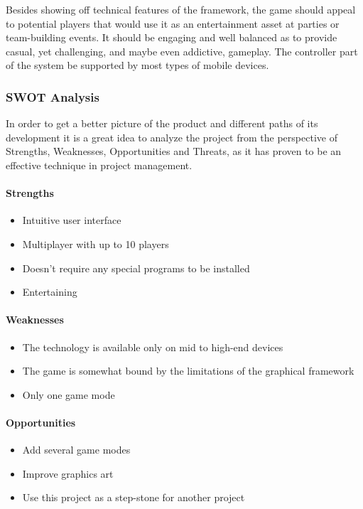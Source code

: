 Besides showing off technical features of the framework, the game should
appeal to potential players that would use it as an entertainment asset at
parties or team-building events. It should be engaging and well balanced as to
provide casual, yet challenging, and maybe even addictive, gameplay. The
controller part of the system be supported by most types of mobile devices.

\newpage
\subsubsection{SWOT Analysis}

In order to get a better picture of the product and different paths of its
development it is a great idea to analyze the project from the perspective of
Strengths, Weaknesses, Opportunities and Threats, as it has proven to be an
effective technique in project management.

\paragraph{Strengths}

\begin{itemize}
    \item Intuitive user interface
    \item Multiplayer with up to 10 players
    \item Doesn't require any special programs to be installed
    \item Entertaining
\end{itemize}

\paragraph{Weaknesses}

\begin{itemize}
    \item The technology is available only on mid to high-end devices
    \item The game is somewhat bound by the limitations of the graphical framework
    \item Only one game mode
\end{itemize}

\paragraph{Opportunities}

\begin{itemize}
    \item Add several game modes
    \item Improve graphics art
    \item Use this project as a step-stone for another project
\end{itemize}

